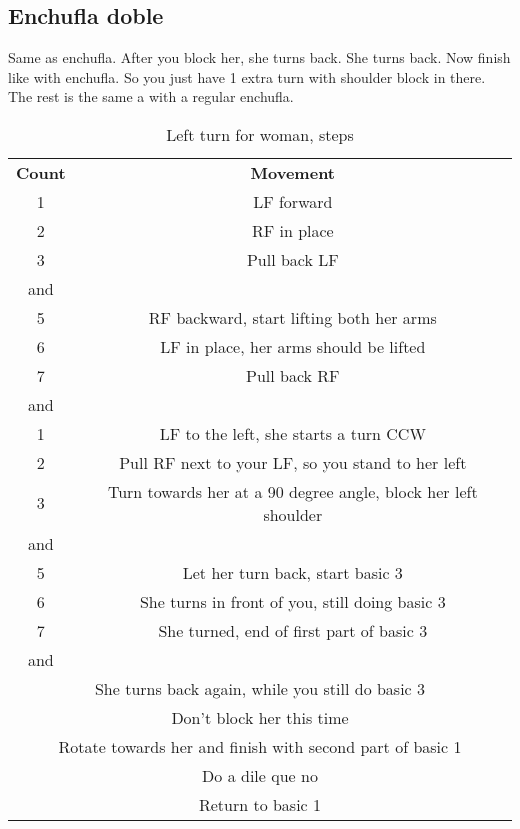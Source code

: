 \subsection{Enchufla doble}
Same as enchufla.
After you block her, she turns back.
She turns back.
Now finish like with enchufla.
So you just have 1 extra turn with shoulder block in there.
The rest is the same a with a regular enchufla.
\begin{table}[H]
\centering
\begin{tabular}{cc}
  \toprule
  \textbf{Count} & \textbf{Movement}\\
  \cmidrule(lr){1-1}\cmidrule(lr){2-2}
  1 & LF forward\\
  2 & RF in place\\
  3 & Pull back LF\\
  and &\\
  5 & RF backward, start lifting both her arms\\
  6 & LF in place, her arms should be lifted\\
  7 & Pull back RF\\
  and &\\
  1 & LF to the left, she starts a turn CCW\\
  2 & Pull RF next to your LF, so you stand to her left\\
  3 & Turn towards her at a 90 degree angle, block her left shoulder\\
  and &\\
  5 & Let her turn back, start basic 3\\
  6 & She turns in front of you, still doing basic 3\\
  7 & She turned, end of first part of basic 3\\
  and &\\
  \multicolumn{2}{c}{She turns back again, while you still do basic 3}\\
  \multicolumn{2}{c}{Don't block her this time}\\
  \multicolumn{2}{c}{Rotate towards her and finish with second part of basic 1}\\
  \multicolumn{2}{c}{Do a dile que no}\\
  \multicolumn{2}{c}{Return to basic 1}\\
  \bottomrule
\end{tabular}
\label{left_turn_for_woman_steps}
\caption{Left turn for woman, steps}
\end{table}


